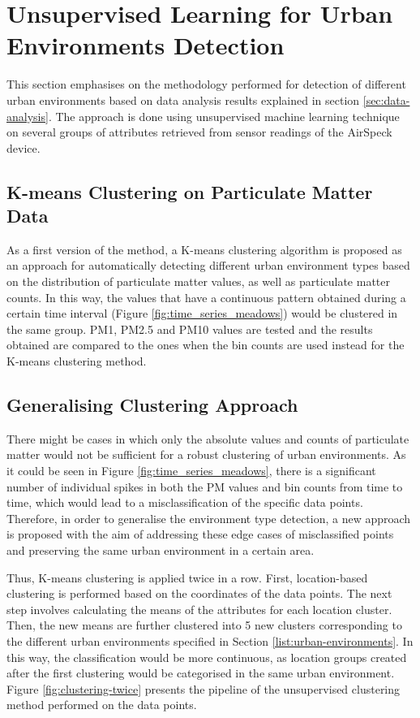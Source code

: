 \documentclass[bsc,frontabs,twoside,singlespacing,parskip,deptreport]{infthesis}     %
\begin{document}
\section{Unsupervised Learning for Urban Environments Detection}

This section emphasises on the methodology performed for detection of different urban environments based on data analysis results explained in section \ref{sec:data-analysis}. The approach is done using unsupervised machine learning technique on several groups of attributes retrieved from sensor readings of the AirSpeck device.

\subsection{K-means Clustering on Particulate Matter Data}

As a first version of the method, a K-means clustering algorithm is proposed as an approach for automatically detecting different urban environment types based on the distribution of particulate matter values, as well as particulate matter counts. In this way, the values that have a continuous pattern obtained during a certain time interval (Figure \ref{fig:time_series_meadows}) would be clustered in the same group. PM1, PM2.5 and PM10 values are tested and the results obtained are compared to the ones when the bin counts are used instead for the K-means clustering method.

\subsection{Generalising Clustering Approach}
\label{subsec:generic-clustering}

There might be cases in which only the absolute values and counts of particulate matter would not be sufficient for a robust clustering of urban environments. As it could be seen in Figure \ref{fig:time_series_meadows}, there is a significant number of individual spikes in both the PM values and bin counts  from time to time, which would lead to a misclassification of the specific data points. Therefore, in order to generalise the environment type detection, a new approach is proposed with the aim of addressing these edge cases of misclassified points and preserving the same urban environment in a certain area. 

Thus, K-means clustering is applied twice in a row. First, location-based clustering is performed based on the coordinates of the data points. The next step involves calculating the means of the attributes for each location cluster. Then, the new means are further clustered into 5 new clusters corresponding to the different urban environments specified in Section \ref{list:urban-environments}. In this way, the classification would be more continuous, as location groups created after the first clustering would be categorised in the same urban environment. Figure \ref{fig:clustering-twice} presents the pipeline of the unsupervised clustering method performed on the data points.
\end{document}
